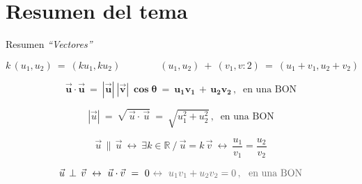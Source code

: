 \newpage
\section{Resumen del tema}
\vspace{1.5cm}	
	
	
\begin{myblock}{Resumen \emph{``Vectores''}}

\vspace{2mm}
$$k\, (u_1,u_2) \ = \ (ku_1,ku_2)\qquad \qquad (u_1,u_2)\ + \ (v_1,v:2)\ = \ (u_1+v_1,u_2+v_2)$$

$$\boldsymbol{ \vec u \cdot \vec u \ = \ |\vec u|\ |\vec v|\ \cos \theta \ = \ u_1v_1 \, + \, u_2v_2}\, , \ \text{ en una BON} $$

$$|\vec u|\ = \ \sqrt{\, \vec u \cdot\, \vec u} \ = \ \sqrt{u_1^2+u_2^2}\, , \ \text{ en una BON} $$

$$\vec u \, \parallel \, \vec u \ \leftrightarrow \ \exists k \in \mathbb R \ / \ \vec u = k\, \vec v \ \leftrightarrow \ \dfrac{u_1}{v_1}=\dfrac{u_2}{v_2}$$

$$\vec u \, \perp \, \vec v \ \leftrightarrow \ \vec u \cdot \vec v \ = \ 0  \ \textcolor{gris}{ \leftrightarrow \ u_1v_1+u_2v_2=0 \, , \ \text{ en una BON} }$$
 
	
\end{myblock}
	
	
	
	

